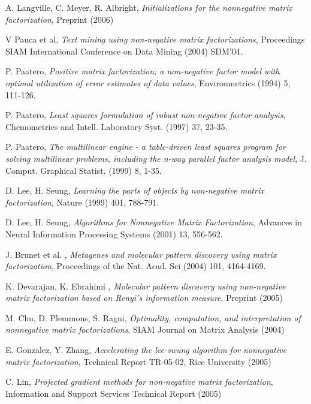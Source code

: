 \documentclass[final,leqno,onefignum,onetabnum]{siamltex1213}
\begin{document}
\begin{thebibliography}{1}

 {\sc A. Langville, C. Meyer, R. Albright},
{\em Initializations for the nonnegative matrix factorization}, Preprint (2006) 

 {\sc V Pauca et al},
{\em Text mining using non-negative matrix factorizations}, Proceedings SIAM International Conference on Data Mining (2004) SDM'04. 

 {\sc P. Paatero},
{\em Positive matrix factorization; a non-negative factor model with optimal utilization of error estimates of data values}, Environmetrics (1994) 5, 111-126.

 {\sc P. Paatero},
{\em Least squares formulation of robust non-negative factor analysis}, Chemometrics and Intell. Laboratory Syst. (1997) 37, 23-35.

 {\sc P. Paatero},
{\em The multilinear engine - a table-driven least squares program for solving multilinear problems, including the n-way parallel factor analysis model}, J. Comput. Graphical Statist. (1999) 8, 1-35.

 {\sc D. Lee, H. Seung},
{\em Learning the parts of objects by non-negative matrix factorization}, Nature (1999) 401, 788-791.

 {\sc D. Lee, H. Seung},
{\em Algorithms for Nonnegative Matrix Factorization}, Advances in Neural Information Processing Systems (2001) 13, 556-562.

 {\sc J. Brunet et al. },
{\em Metagenes and molecular pattern discovery using matrix factorization}, Proceedings of the Nat. Acad. Sci (2004) 101, 4164-4169. 

 {\sc K. Devarajan, K. Ebrahimi },
{\em Molecular pattern discovery using non-negative matrix factorization based on Renyi's information measure}, Preprint (2005)

 {\sc M. Chu, D. Plemmons, S. Ragni},
{\em Optimality, computation, and interpretation of nonnegative matrix factorizations},  SIAM Journal on Matrix Analysis (2004)

 {\sc E. Gonzalez, Y. Zhang},
{\em Accelerating the lee-swung algorithm for nonnegative matrix factorization}, Technical Report TR-05-02, Rice University (2005)

 {\sc C. Lin},
{\em Projected gradient methods for non-negative matrix factorization}, Information and Support Services Technical Report (2005)


\end{thebibliography}
\end{document}

